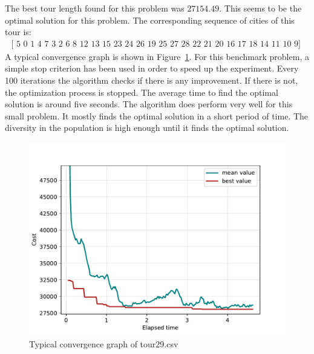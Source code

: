 \documentclass[a4paper,10pt]{article}
\begin{document}



The best tour length found for this problem was $27154.49$. This seems to be the optimal solution for this problem. The corresponding sequence of cities of this tour is: 
\begin{align*}
    \text{[ 5  0  1  4  7  3  2  6  8 12 13 15 23 24 26 19 25 27 28 22 21 20 16 17 18 14 11 10  9] }
\end{align*}
A typical convergence graph is shown in Figure~\ref{fig:convergence}. For this benchmark problem, a simple stop criterion has been used in order to speed up the experiment. Every 100 iterations the algorithm checks if there is any improvement. If there is not, the optimization process is stopped. The average time to find the optimal solution is around five seconds. The algorithm does perform very well for this small problem. It mostly finds the optimal solution in a short period of time. The diversity in the population is high enough until it finds the optimal solution. 
\begin{figure}[H]
    \centering
    \includegraphics[width=.8\linewidth]{img/convergence.pdf}
    \caption{Typical convergence graph of tour29.csv}
    \label{fig:convergence}
\end{figure}
\end{document}

